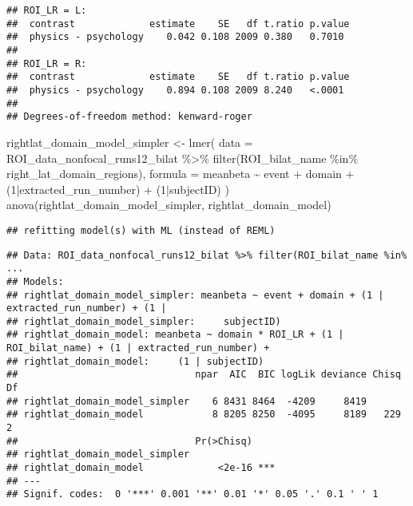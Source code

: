 \documentclass[
]{article}
\newenvironment{Shaded}{\begin{snugshade}}{\end{snugshade}}
\newcommand{\AttributeTok}[1]{\textcolor[rgb]{0.77,0.63,0.00}{#1}}
\newcommand{\DecValTok}[1]{\textcolor[rgb]{0.00,0.00,0.81}{#1}}
\newcommand{\FunctionTok}[1]{\textcolor[rgb]{0.00,0.00,0.00}{#1}}
\newcommand{\NormalTok}[1]{#1}
\newcommand{\OtherTok}[1]{\textcolor[rgb]{0.56,0.35,0.01}{#1}}
\newcommand{\SpecialCharTok}[1]{\textcolor[rgb]{0.00,0.00,0.00}{#1}}
\begin{document}
\begin{verbatim}
## ROI_LR = L:
##  contrast             estimate    SE   df t.ratio p.value
##  physics - psychology    0.042 0.108 2009 0.380   0.7010 
## 
## ROI_LR = R:
##  contrast             estimate    SE   df t.ratio p.value
##  physics - psychology    0.894 0.108 2009 8.240   <.0001 
## 
## Degrees-of-freedom method: kenward-roger
\end{verbatim}

\begin{Shaded}
\begin{Highlighting}[]
\NormalTok{rightlat\_domain\_model\_simpler }\OtherTok{\textless{}{-}} \FunctionTok{lmer}\NormalTok{(}
      \AttributeTok{data =}\NormalTok{ ROI\_data\_nonfocal\_runs12\_bilat }\SpecialCharTok{\%\textgreater{}\%}
        \FunctionTok{filter}\NormalTok{(ROI\_bilat\_name }\SpecialCharTok{\%in\%}\NormalTok{ right\_lat\_domain\_regions),}
      \AttributeTok{formula =}\NormalTok{ meanbeta }\SpecialCharTok{\textasciitilde{}}\NormalTok{ event }\SpecialCharTok{+}\NormalTok{ domain }\SpecialCharTok{+}\NormalTok{ (}\DecValTok{1}\SpecialCharTok{|}\NormalTok{extracted\_run\_number) }\SpecialCharTok{+}\NormalTok{ (}\DecValTok{1}\SpecialCharTok{|}\NormalTok{subjectID)}
\NormalTok{    )}
\FunctionTok{anova}\NormalTok{(rightlat\_domain\_model\_simpler, rightlat\_domain\_model)}
\end{Highlighting}
\end{Shaded}

\begin{verbatim}
## refitting model(s) with ML (instead of REML)
\end{verbatim}

\begin{verbatim}
## Data: ROI_data_nonfocal_runs12_bilat %>% filter(ROI_bilat_name %in%  ...
## Models:
## rightlat_domain_model_simpler: meanbeta ~ event + domain + (1 | extracted_run_number) + (1 | 
## rightlat_domain_model_simpler:     subjectID)
## rightlat_domain_model: meanbeta ~ domain * ROI_LR + (1 | ROI_bilat_name) + (1 | extracted_run_number) + 
## rightlat_domain_model:     (1 | subjectID)
##                               npar  AIC  BIC logLik deviance Chisq Df
## rightlat_domain_model_simpler    6 8431 8464  -4209     8419         
## rightlat_domain_model            8 8205 8250  -4095     8189   229  2
##                               Pr(>Chisq)    
## rightlat_domain_model_simpler               
## rightlat_domain_model             <2e-16 ***
## ---
## Signif. codes:  0 '***' 0.001 '**' 0.01 '*' 0.05 '.' 0.1 ' ' 1
\end{verbatim}
\end{document}
